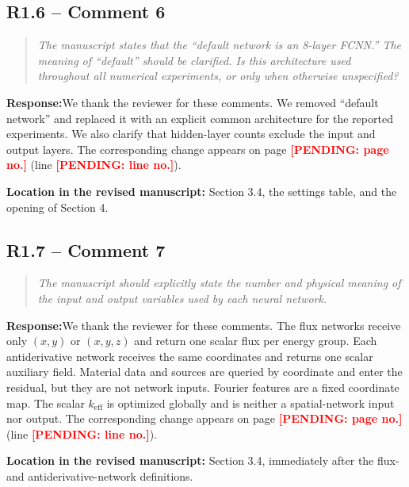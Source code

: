 \documentclass[11pt,a4paper]{article}
\newenvironment{reviewercomment}{\begin{quote}\small\itshape\color{commentgray}}{\end{quote}}
\newcommand{\authorresponse}{\noindent\textbf{Response:}\quad}
\newcommand{\revisionlocation}[1]{\par\noindent\textcolor{locationblue}{\textbf{Location in the revised manuscript: }}#1}
\newcommand{\draftplaceholder}[1]{\textcolor{red}{\textbf{[PENDING: #1]}}}
\begin{document}
\subsection*{R1.6 -- Comment 6}
\begin{reviewercomment}
The manuscript states that the ``default network is an 8-layer FCNN.'' The meaning of ``default'' should be clarified. Is this architecture used throughout all numerical experiments, or only when otherwise unspecified?
\end{reviewercomment}
\authorresponse We thank the reviewer for these comments. We removed “default network” and replaced it with an explicit common architecture for the reported experiments. We also clarify that hidden-layer counts exclude the input and output layers. The corresponding change appears on page \draftplaceholder{page no.} (line \draftplaceholder{line no.}).
\revisionlocation{Section 3.4, the settings table, and the opening of Section 4.}

\subsection*{R1.7 -- Comment 7}
\begin{reviewercomment}
The manuscript should explicitly state the number and physical meaning of the input and output variables used by each neural network.
\end{reviewercomment}
\authorresponse We thank the reviewer for these comments. The flux networks receive only $(x,y)$ or $(x,y,z)$ and return one scalar flux per energy group. Each antiderivative network receives the same coordinates and returns one scalar auxiliary field. Material data and sources are queried by coordinate and enter the residual, but they are not network inputs. Fourier features are a fixed coordinate map. The scalar $k_{\mathrm{eff}}$ is optimized globally and is neither a spatial-network input nor output. The corresponding change appears on page \draftplaceholder{page no.} (line \draftplaceholder{line no.}).
\revisionlocation{Section 3.4, immediately after the flux- and antiderivative-network definitions.}
\end{document}
